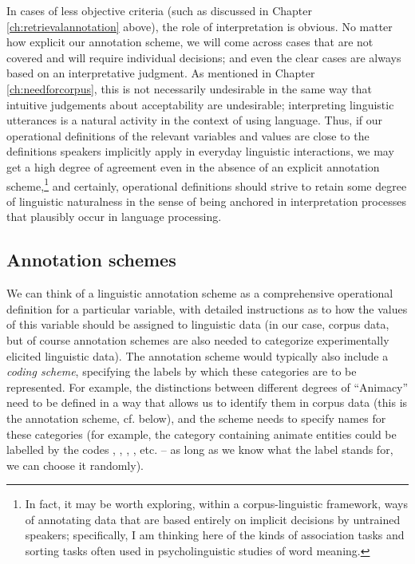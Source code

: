 In cases of less objective criteria (such as  discussed in Chapter \ref{ch:retrievalannotation} above), the role of interpretation is obvious. No matter how explicit our annotation scheme, we will come across cases that are not covered and will require individual decisions; and even the clear cases are always based on an interpretative judgment. As mentioned in Chapter \ref{ch:needforcorpus}, this is not necessarily undesirable in the same way that intuitive judgements about acceptability are undesirable; interpreting linguistic utterances is a natural activity in the context of using language. Thus, if our operational definitions of the relevant variables and values are close to the definitions speakers implicitly apply in everyday linguistic interactions, we may get a high degree of agreement even in the absence of an explicit annotation scheme,\footnote{In fact, it may be worth exploring, within a corpus-linguistic framework, ways of annotating data that are based entirely on implicit decisions by untrained speakers; specifically, I am thinking here of the kinds of association tasks and sorting tasks often used in psycholinguistic studies of word meaning.} and certainly, operational definitions should strive to retain some degree of linguistic naturalness in the sense of being anchored in interpretation processes that plausibly occur in language processing. 

\subsection{Annotation schemes}
\label{sec:annotationschemes}

We can think of a linguistic annotation scheme as a comprehensive operational definition for a particular variable, with detailed instructions as to how the values of this variable should be assigned to linguistic data (in our case, corpus data, but of course annotation schemes are also needed to categorize experimentally elicited linguistic data). The annotation scheme would typically also include a \emph{coding scheme}, specifying the labels by which these categories are to be represented. For example, the distinctions between different degrees of ``Animacy'' need to be defined in a way that allows us to identify them in corpus data (this is the annotation scheme, cf. below), and the scheme needs to specify names for these categories (for example, the category containing animate entities could be labelled by the codes , , , , etc. -- as long as we know what the label stands for, we can choose it randomly).

